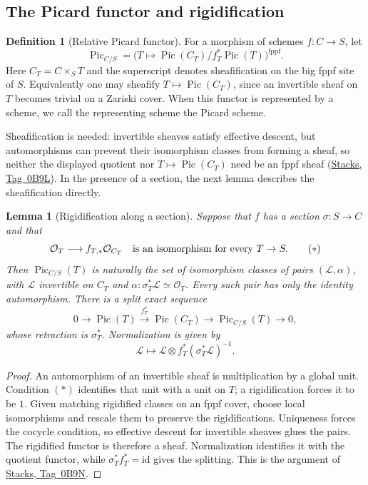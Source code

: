 \documentclass[11pt,a4paper]{article}
\numberwithin{equation}{section}
\newtheorem{lemma}[theorem]{Lemma}
\theoremstyle{definition}
\newtheorem{definition}[theorem]{Definition}
\theoremstyle{remark}
\newcommand{\stacks}[1]{\href{https://stacks.math.columbia.edu/tag/#1}{\textnormal{Stacks, Tag~#1}}}
\begin{document}
\subsection{The Picard functor and rigidification}
\label{app:picard-functor}

\begin{definition}[Relative Picard functor]
For a morphism of schemes $f:C\to S$, let
\[
 \operatorname{Pic}_{C/S}
   =\bigl(T\longmapsto
       \operatorname{Pic}(C_T)/f_T^*\operatorname{Pic}(T)\bigr)^{\mathrm{fppf}}.
\]
Here $C_T=C\times_ST$ and the superscript denotes sheafification on
the big fppf site of $S$. Equivalently one may sheafify
$T\mapsto\operatorname{Pic}(C_T)$, since an invertible sheaf on $T$
becomes trivial on a Zariski cover. When this functor is represented by
a scheme, we call the representing scheme the Picard scheme.
\end{definition}

Sheafification is needed: invertible sheaves satisfy effective
descent, but automorphisms can prevent their isomorphism classes from
forming a sheaf, so neither the displayed quotient nor
$T\mapsto\operatorname{Pic}(C_T)$ need be an fppf sheaf
(\stacks{0B9L}). In the presence of a section, the next lemma
describes the sheafification directly.

\begin{lemma}[Rigidification along a section]
\label{app:picard-rigidification}
Suppose that $f$ has a section $\sigma:S\to C$ and that
\[
 \mathcal O_T\longrightarrow f_{T,*}\mathcal O_{C_T}
 \quad\text{is an isomorphism for every }T\to S.
 \tag{\ensuremath{\ast}}
\]
Then $\operatorname{Pic}_{C/S}(T)$ is naturally the set of isomorphism
classes of pairs $(\mathcal L,\alpha)$, with $\mathcal L$ invertible on
$C_T$ and $\alpha:\sigma_T^*\mathcal L\simeq\mathcal O_T$.
Every such pair has only the identity automorphism. There is a split
exact sequence
\[
 0\longrightarrow\operatorname{Pic}(T)
   \xrightarrow{f_T^*}\operatorname{Pic}(C_T)
   \longrightarrow\operatorname{Pic}_{C/S}(T)
   \longrightarrow0,
\]
whose retraction is $\sigma_T^*$. Normalization is given by
\[
 \mathcal L\longmapsto
 \mathcal L\otimes f_T^*(\sigma_T^*\mathcal L)^{-1}.
\]
\end{lemma}

\begin{proof}
An automorphism of an invertible sheaf is multiplication by a global
unit. Condition $(\ast)$ identifies that unit with a unit on $T$; a
rigidification forces it to be $1$. Given matching rigidified classes
on an fppf cover, choose local isomorphisms and rescale them to preserve
the rigidifications. Uniqueness forces the cocycle condition, so
effective descent for invertible sheaves glues the pairs. The
rigidified functor is therefore a sheaf. Normalization identifies it
with the quotient functor, while $\sigma_T^*f_T^*=\mathrm{id}$ gives
the splitting. This is the argument of \stacks{0B9N}.
\end{proof}
\end{document}
